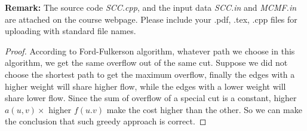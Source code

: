 \documentclass[12pt,a4paper,UTF8]{article}
\theoremstyle{definition}
\begin{document}
\begin{enumerate}
\hspace{1cm}
\begin{minipage}[t]{0.45\textwidth}
\textbf{Remark:} The source code \emph{SCC.cpp}, and the input data \emph{SCC.in} and \emph{MCMF.in} are attached on the course webpage. Please include your .pdf, .tex, .cpp files for uploading with standard file names.
\end{minipage}
    \begin{proof}
        According to Ford-Fulkerson algorithm, whatever path we choose in this algorithm, we get the same overflow out of the same cut. Suppose we did not choose the shortest path to get the maximum overflow, finally the edges with a higher weight will share higher flow, while the edges with a lower weight will share lower flow. Since the sum of overflow of a special cut is a constant, higher $ a(u, v) \times$ higher $ f(u.v) $ make the cost higher than the other. 
        So we can make the conclusion that such greedy approach is correct.
    \end{proof}

\end{enumerate}






\end{document}
